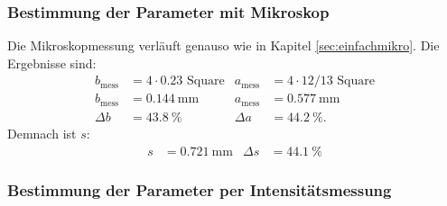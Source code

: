 \subsubsection{Bestimmung der Parameter mit Mikroskop}

Die Mikroskopmessung verläuft genauso wie in Kapitel \ref{sec:einfachmikro}.
Die Ergebnisse sind:
\begin{align*}
  b_\text{mess} &= 4 \cdot 0.23 \text{ Square} & a_\text{mess} &= 4\cdot 12/13 \text{ Square}\\
  b_\text{mess} &= \SI{0.144}{\milli\meter} & a_\text{mess} &= \SI{0.577}{\milli\meter}\\
  \Delta b &= \SI{43.8}{\percent} & \Delta a &= \SI{44.2}{\percent}.
\end{align*}
Demnach ist $s$:
\begin{align*}
  s &= \SI{0.721}{\milli\meter} & \Delta s &= \SI{44.1}{\percent}
\end{align*}

\subsubsection{Bestimmung der Parameter per Intensitätsmessung}

